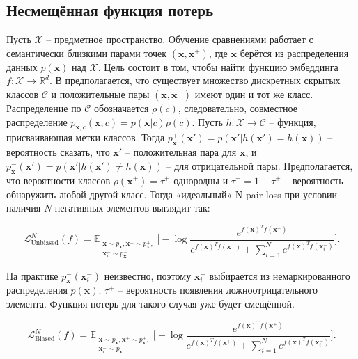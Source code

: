 \documentclass[a4paper, 14pt]{article}
\begin{document}
\subsection{Несмещённая функция потерь}

Пусть $\mathcal{X}$ -- предметное пространство. Обучение сравнениями работает с семантически близкими парами точек $(\mathbf{x}, \mathbf{x}^+)$, где $\mathbf{x}$ берётся из распределения данных $p(\mathbf{x})$ над $\mathcal{X}$. Цель состоит в том, чтобы найти функцию эмбеддинга $f: \mathcal{X} \rightarrow \mathbb{R}^d$. В \citep{chuang2020debiased} предполагается, что существует множество дискретных скрытых классов $\mathcal{C}$ и положительные пары $(\mathbf{x}, \mathbf{x}^+)$ имеют один и тот же класс. Распределение по $\mathcal{C}$ обозначается $\rho(c)$, следовательно, совместное распределение $p_{\mathbf{x},c}(\textbf{x}, c) = p(\textbf{x}|c)\rho(c)$. Пусть $h : \mathcal{X} \rightarrow \mathcal{C}$ -- функция, присваивающая метки классов. Тогда $p^+_\mathbf{x}(\textbf{x}') = p(\textbf{x}'|h(\textbf{x}') = h(\textbf{x}))$ -- вероятность сказать, что $\textbf{x}'$ -- положительная пара для $\textbf{x}$, и $p^-_\mathbf{x}(\textbf{x}') = p(\textbf{x}'|h(\textbf{x}') \neq h(\textbf{x}))$ -- для отрицательной пары. Предполагается, что вероятности классов $\rho(\textbf{x}^+) = \tau^+$ однородны и $\tau^- = 1 - \tau^+$ -- вероятность обнаружить любой другой класс. Тогда «идеальный» N-pair loss при условии наличия $N$ негативных элементов выглядит так:

\begin{equation}\label{eq:1}
\mathcal{L}_{\text{Unbiased}}^N(f) = \mathbb{E}_{\substack{\textbf{x} \sim p_\mathbf{x}, \textbf{x}^+ \sim p^+_\mathbf{x},\\ \textbf{x}_i^- \sim p_\mathbf{x}^-}} \bigg[-\log \frac{e^{f(\textbf{x})^T f(\textbf{x}^+)}}{e^{f(\textbf{x})^T f(\textbf{x}^+)} + \sum _{i=1}^N e^{f(\textbf{x})^T f(\textbf{x}_i^-)}}\bigg].
\end{equation}

На практике $p_\mathbf{x}^-(\textbf{x}_i^-)$ неизвестно, поэтому $\textbf{x}_i^-$ выбирается из немаркированного распределения $p(\textbf{x})$. $\tau^+$ -- вероятность появления ложноотрицательного элемента. Функция потерь для такого случая уже будет смещённой.

\begin{equation}\label{eq:2}
\mathcal{L}_{\text{Biased}}^N(f) = \mathbb{E}_{\substack{\textbf{x} \sim p_\mathbf{x}, \textbf{x}^+ \sim p^+_\mathbf{x},\\ \textbf{x}_i^- \sim p_\mathbf{x}}} \bigg[-\log \frac{e^{f(\textbf{x})^T f(\textbf{x}^+)}}{e^{f(\textbf{x})^T f(\textbf{x}^+)} + \sum _{i=1}^N e^{f(\textbf{x})^T f(\textbf{x}_i^-)}}\bigg].
\end{equation}
\end{document}
